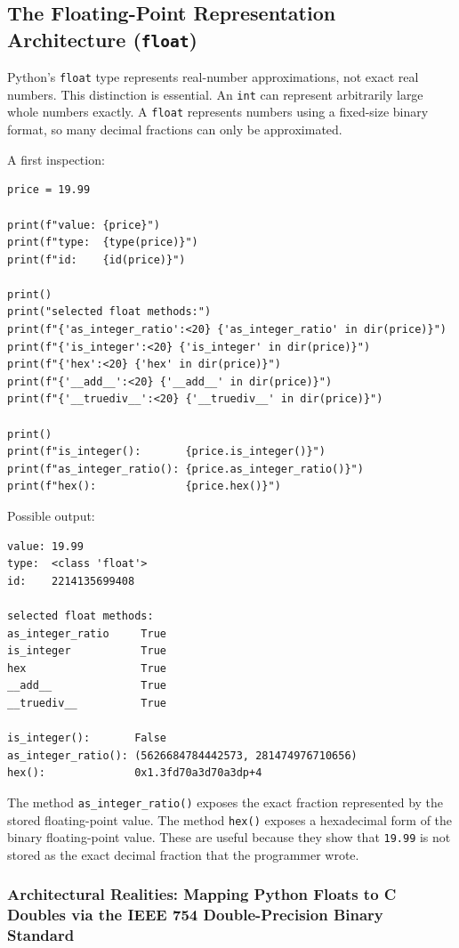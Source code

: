 \subsection{The Floating-Point Representation Architecture (\texttt{float})}

Python's \texttt{float} type represents real-number approximations, not exact real numbers. This distinction is essential. An \texttt{int} can represent arbitrarily large whole numbers exactly. A \texttt{float} represents numbers using a fixed-size binary format, so many decimal fractions can only be approximated.

A first inspection:

\begin{verbatim}
price = 19.99

print(f"value: {price}")
print(f"type:  {type(price)}")
print(f"id:    {id(price)}")

print()
print("selected float methods:")
print(f"{'as_integer_ratio':<20} {'as_integer_ratio' in dir(price)}")
print(f"{'is_integer':<20} {'is_integer' in dir(price)}")
print(f"{'hex':<20} {'hex' in dir(price)}")
print(f"{'__add__':<20} {'__add__' in dir(price)}")
print(f"{'__truediv__':<20} {'__truediv__' in dir(price)}")

print()
print(f"is_integer():       {price.is_integer()}")
print(f"as_integer_ratio(): {price.as_integer_ratio()}")
print(f"hex():              {price.hex()}")
\end{verbatim}

Possible output:

\begin{verbatim}
value: 19.99
type:  <class 'float'>
id:    2214135699408

selected float methods:
as_integer_ratio     True
is_integer           True
hex                  True
__add__              True
__truediv__          True

is_integer():       False
as_integer_ratio(): (5626684784442573, 281474976710656)
hex():              0x1.3fd70a3d70a3dp+4
\end{verbatim}

The method \texttt{as\_integer\_ratio()} exposes the exact fraction represented by the stored floating-point value. The method \texttt{hex()} exposes a hexadecimal form of the binary floating-point value. These are useful because they show that \texttt{19.99} is not stored as the exact decimal fraction that the programmer wrote.

\subsubsection{Architectural Realities: Mapping Python Floats to C Doubles via the IEEE 754 Double-Precision Binary Standard}


